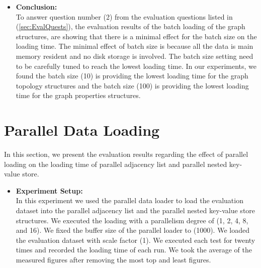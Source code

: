 {\begin{itemize}
The effect of the percentage of cache misses and the number of times we flush the buffer are contradicting each other. This leads to the decrease in loading time at the lower batch sizes when the cache misses are at its lowest and the increase in loading time at the larger batch sizes when the number of times we flush the buffer contents is the smallest.

We show in (\ref{tbl:perf-analysis}), the change in the number of times we flush the buffer as well as the percentage of cache misses caused by the change in batch size.


\item \textbf{Conclusion:}\\
To answer question number (2) from the evaluation questions listed in (\ref{sec:EvalQuests}), the evaluation results of the batch loading of the graph structures, are showing that there is a minimal effect for the batch size on the loading time. The minimal effect of batch size is because all the data is main memory resident and no disk storage is involved. The batch size setting need to be carefully tuned to reach the lowest loading time. In our experiments, we found the batch size (10) is providing the lowest loading time for the graph topology structures and the batch size (100) is providing the lowest loading time for the graph properties structures. 

\end{itemize}

\section{Parallel Data Loading}
\label{sec:eval-parallelLoading}

In this section, we present the evaluation results regarding the effect of parallel loading on the loading time of parallel adjacency list and parallel nested key-value store.

\begin{itemize}

\item \textbf{Experiment Setup:}\\
In this experiment we used the parallel data loader to load the evaluation dataset into the parallel adjacency list and the parallel nested key-value store structures. We executed the loading with a parallelism degree of (1, 2, 4, 8, and 16). We fixed the buffer size of the parallel loader to (1000). We loaded the evaluation dataset with scale factor (1). We executed each test for twenty times and recorded the loading time of each run. We took the average of the measured figures after removing the most top and least figures.




\end{itemize}}
